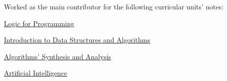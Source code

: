 \documentclass[]{deedy-resume-openfont}
\begin{document}
\begin{minipage}[t]{0.66\textwidth}
\sectionsep

Worked as the main contributor for the following curricular units' notes:
\vspace{\topsep} %
\begin{tightemize}
\item \href{https://resumos.leic.pt/lp}{Logic for Programming}
\item \href{https://resumos.leic.pt/iaed}{Introduction to Data Structures and Algorithms}
\item \href{https://resumos.leic.pt/asa}{Algorithms' Synthesis and Analysis}
\item \href{https://resumos.leic.pt/ia}{Artificial Intelligence}
\end{tightemize}

\end{minipage} 
\end{document}
